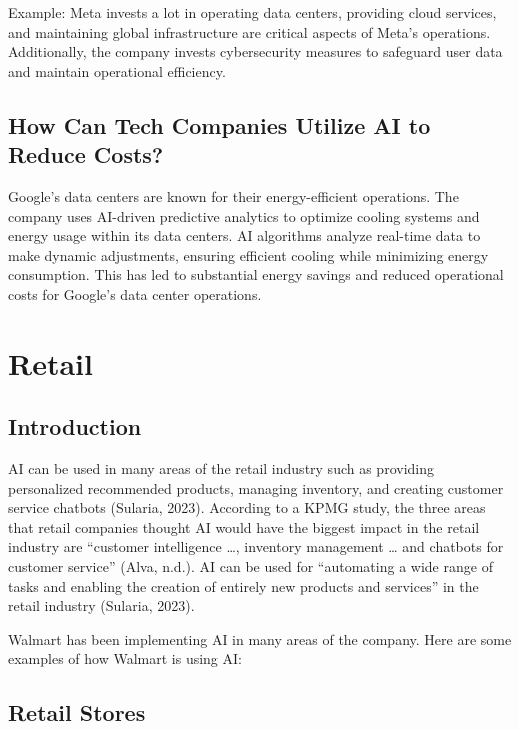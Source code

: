 \documentclass[
]{article}
\begin{document}
Example: Meta invests a lot in operating data centers, providing cloud services, and maintaining global infrastructure are critical aspects of Meta's operations. Additionally, the company invests cybersecurity measures to safeguard user data and maintain operational efficiency.

\hypertarget{how-can-tech-companies-utilize-ai-to-reduce-costs}{%
\subsection{How Can Tech Companies Utilize AI to Reduce Costs?}\label{how-can-tech-companies-utilize-ai-to-reduce-costs}}

Google's data centers are known for their energy-efficient operations. The company uses AI-driven predictive analytics to optimize cooling systems and energy usage within its data centers. AI algorithms analyze real-time data to make dynamic adjustments, ensuring efficient cooling while minimizing energy consumption. This has led to substantial energy savings and reduced operational costs for Google's data center operations.

\hypertarget{retail}{%
\section{Retail}\label{retail}}

\hypertarget{introduction-1}{%
\subsection{Introduction}\label{introduction-1}}

AI can be used in many areas of the retail industry such as providing personalized recommended products, managing inventory, and creating customer service chatbots (Sularia, 2023). According to a KPMG study, the three areas that retail companies thought AI would have the biggest impact in the retail industry are ``customer intelligence \ldots, inventory management \ldots{} and chatbots for customer service'' (Alva, n.d.). AI can be used for ``automating a wide range of tasks and enabling the creation of entirely new products and services'' in the retail industry (Sularia, 2023).

Walmart has been implementing AI in many areas of the company. Here are some examples of how Walmart is using AI:

\hypertarget{retail-stores}{%
\subsection{Retail Stores}\label{retail-stores}}
\end{document}
